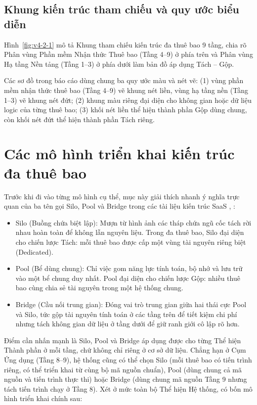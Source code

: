 \subsection{Khung kiến trúc tham chiếu và quy ước biểu diễn}\label{v4-sec-2-1-2}

Hình~\ref{fig:v4-2-1} mô tả Khung tham chiếu kiến trúc đa thuê bao 9 tầng, chia rõ Phân vùng Phần mềm Nhận thức Thuê bao (Tầng 4--9) ở phía trên và Phân vùng Hạ tầng Nền tảng (Tầng 1--3) ở phía dưới làm bản đồ áp dụng Tách -- Gộp.


Các sơ đồ trong báo cáo dùng chung ba quy ước màu và nét vẽ: (1) vùng phần mềm nhận thức thuê bao (Tầng 4--9) vẽ khung nét liền, vùng hạ tầng nền (Tầng 1--3) vẽ khung nét đứt; (2) khung màu riêng đại diện cho không gian hoặc dữ liệu logic của từng thuê bao; (3) khối nét liền thể hiện thành phần Gộp dùng chung, còn khối nét đứt thể hiện thành phần Tách riêng.

\section{Các mô hình triển khai kiến trúc đa thuê bao}\label{v4-sec-2-2}

Trước khi đi vào từng mô hình cụ thể, mục này giải thích nhanh ý nghĩa trực quan của ba tên gọi Silo, Pool và Bridge trong các tài liệu kiến trúc SaaS \cite{v4-18}, \cite{v4-19}:

\begin{itemize}
\item
  Silo (Buồng chứa biệt lập): Mượn từ hình ảnh các tháp chứa ngũ cốc tách rời nhau hoàn toàn để không lẫn nguyên liệu. Trong đa thuê bao, Silo đại diện cho chiến lược Tách: mỗi thuê bao được cấp một vùng tài nguyên riêng biệt (Dedicated).
\item
  Pool (Bể dùng chung): Chỉ việc gom năng lực tính toán, bộ nhớ và lưu trữ vào một bể chung duy nhất. Pool đại diện cho chiến lược Gộp: nhiều thuê bao cùng chia sẻ tài nguyên trong một hệ thống chung.
\item
  Bridge (Cầu nối trung gian): Đóng vai trò trung gian giữa hai thái cực Pool và Silo, tức gộp tài nguyên tính toán ở các tầng trên để tiết kiệm chi phí nhưng tách không gian dữ liệu ở tầng dưới để giữ ranh giới cô lập rõ hơn.
\end{itemize}

Điểm cần nhấn mạnh là Silo, Pool và Bridge áp dụng được cho từng Thể hiện Thành phần ở mỗi tầng, chứ không chỉ riêng ở cơ sở dữ liệu. Chẳng hạn ở Cụm Ứng dụng (Tầng 8--9), hệ thống cũng có thể chọn Silo (mỗi thuê bao có tiến trình riêng, có thể triển khai từ cùng bộ mã nguồn chuẩn), Pool (dùng chung cả mã nguồn và tiến trình thực thi) hoặc Bridge (dùng chung mã nguồn Tầng 9 nhưng tách tiến trình chạy ở Tầng 8). Xét ở mức toàn bộ Thể hiện Hệ thống, có bốn mô hình triển khai chính sau:

